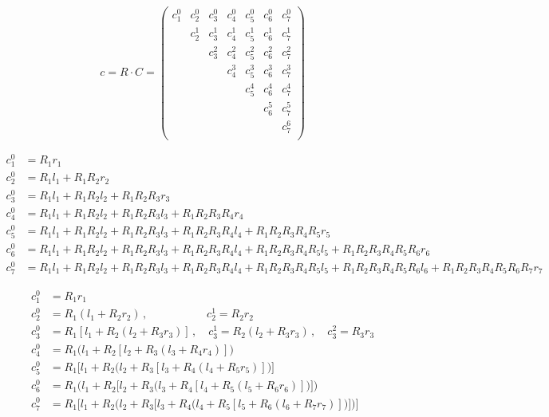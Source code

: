 {\begin{equation*}
    c = R \cdot C =
    \begin{pmatrix}
        c_1^0 & c_2^0 & c_3^0 & c_4^0 & c_5^0 & c_6^0 & c_7^0 \\
              & c_2^1 & c_3^1 & c_4^1 & c_5^1 & c_6^1 & c_7^1 \\
              &       & c_3^2 & c_4^2 & c_5^2 & c_6^2 & c_7^2 \\
              &       &       & c_4^3 & c_5^3 & c_6^3 & c_7^3 \\
              &       &       &       & c_5^4 & c_6^4 & c_7^4 \\
              &       &       &       &       & c_6^5 & c_7^5 \\
              &       &       &       &       &       & c_7^6 \\
    \end{pmatrix}
\end{equation*}

\begin{align*}
    c_1^0 &= R_1 r_1 \\
    c_2^0 &= R_1 l_1 + R_1 R_2 r_2 \\
    c_3^0 &= R_1 l_1 + R_1 R_2 l_2 + R_1 R_2 R_3 r_3 \\
    c_4^0 &= R_1 l_1 + R_1 R_2 l_2 + R_1 R_2 R_3 l_3 + R_1 R_2 R_3 R_4 r_4 \\
    c_5^0 &= R_1 l_1 + R_1 R_2 l_2 + R_1 R_2 R_3 l_3 + R_1 R_2 R_3 R_4 l_4 + R_1 R_2 R_3 R_4 R_5 r_5 \\
    c_6^0 &= R_1 l_1 + R_1 R_2 l_2 + R_1 R_2 R_3 l_3 + R_1 R_2 R_3 R_4 l_4 + R_1 R_2 R_3 R_4 R_5 l_5 + R_1 R_2 R_3 R_4 R_5 R_6 r_6 \\
    c_7^0 &= R_1 l_1 + R_1 R_2 l_2 + R_1 R_2 R_3 l_3 + R_1 R_2 R_3 R_4 l_4 + R_1 R_2 R_3 R_4 R_5 l_5 + R_1 R_2 R_3 R_4 R_5 R_6 l_6 + R_1 R_2 R_3 R_4 R_5 R_6 R_7 r_7
\end{align*}

\begin{align*}
    c_1^0 &= R_1 r_1 \\
    c_2^0 &= R_1 (l_1 + R_2 r_2) \,, \qquad\qquad\quad\; c_2^1 = R_2 r_2 \\
    c_3^0 &= R_1 [l_1 + R_2 (l_2 + R_3 r_3)] \,, \quad c_3^1 = R_2 (l_2 + R_3 r_3) \,, \quad c_3^2 = R_3 r_3 \\
    c_4^0 &= R_1 \big(l_1 + R_2 [l_2 + R_3 (l_3 + R_4 r_4)]\big) \\
    c_5^0 &= R_1 \big[l_1 + R_2 \big(l_2 + R_3 [l_3 + R_4 (l_4 + R_5 r_5)]\big)\big] \\
    c_6^0 &= R_1 \Big(l_1 + R_2 \big[l_2 + R_3 \big(l_3 + R_4 [l_4 + R_5 (l_5 + R_6 r_6)]\big)\big]\Big) \\
    c_7^0 &= R_1 \Big[l_1 + R_2 \Big(l_2 + R_3 \big[l_3 + R_4 \big(l_4 + R_5 [l_5 + R_6 (l_6 + R_7 r_7)]\big)\big]\Big)\Big]
\end{align*}

}
